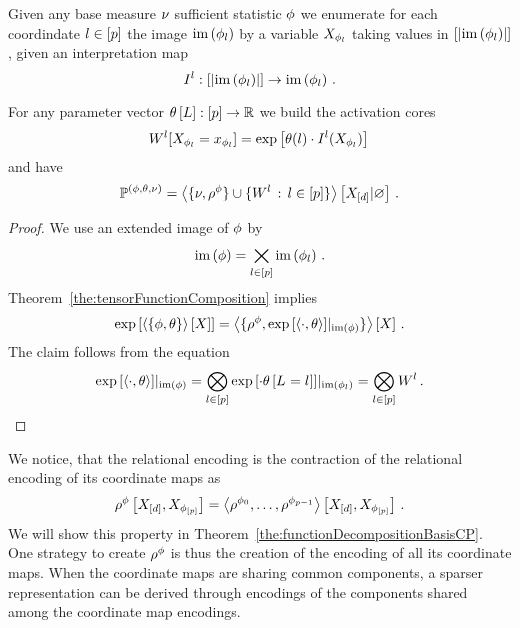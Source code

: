 \begin{theorem}\label{def:expFamilyTensorRep}
	Given any base measure $\nu$ sufficient statistic $\phi$ we enumerate for each coordindate $l\in[p]$ the image $\mathrm{im}\left(\phi_{l}\right)$ by a variable $X_{\phi_{l}}$ taking values in $[\left|\mathrm{im}\left(\phi_{l}\right)\right|]$, given an interpretation map
		\[ I^{l} : 
		[\left|\mathrm{im}\left(\phi_{l}\right)\right|] \rightarrow \mathrm{im}\left(\phi_{l}\right) \, . \]
	
	For any parameter vector $\theta\left[L\right]:[p]\rightarrow\mathbb{R}$ we build the activation cores
		\[ W^{l}[X_{\phi_{l}}=x_{\phi_{l}}] 
		= \mathrm{exp}\left[\theta(l) \cdot I^{l}(X_{\phi_{l}}) \right] \,   \]
	and have
		\[ \mathbb{P}^{(\phi,\theta,\nu)} = 
		\left\langle \{\nu,\rho^{\phi}\}\cup\{W^{l} \, : \, l\in[p]\}\right\rangle \left[ X_{[d]} | \varnothing \right] \, . 
		\]
\end{theorem}
\begin{proof}
	We use an extended image of $\phi$ by  %
		\[ \mathrm{im}\left(\phi\right) = \bigtimes_{l\in[p]} \mathrm{im}\left(\phi_{l}\right) \, . \]
	Theorem~\ref{the:tensorFunctionComposition} implies
		\[ \mathrm{exp}\left[\left\langle \{\phi, \theta\}\right\rangle \left[ X \right]\right]
		= \left\langle \{\rho^{\phi}, {\mathrm{exp}\left[\braket{\cdot, \theta}\right]}|_{\mathrm{im}\left(\phi\right)} \}\right\rangle \left[ X \right] \, . \]
	The claim follows from the equation
		\[ {\mathrm{exp}\left[\braket{\cdot, \theta}\right]}|_{\mathrm{im}\left(\phi\right)} 
		= \bigotimes_{l\in[p]} {\mathrm{exp}\left[\cdot \theta\left[L_{}=l_{}\right]\right]}|_{\mathrm{im}\left(\phi_{l}\right)}  
		= \bigotimes_{l\in[p]} W^{l} \, . \]
\end{proof}


We notice, that the relational encoding is the contraction of the relational encoding of its coordinate maps as 
	\[ \rho^{\phi}\left[X_{[d]},X_{\phi_{[p]}}\right] = \left\langle \rho^{\phi_{0}},\ldots,\rho^{\phi_{p-1}}\right\rangle \left[ X_{[d]},X_{\phi_{[p]}} \right] \, .  \]
We will show this property in Theorem~\ref{the:functionDecompositionBasisCP}.
One strategy to create $\rho^{\phi}$ is thus the creation of the encoding of all its coordinate maps.
When the coordinate maps are sharing common components, a sparser representation can be derived through encodings of the components shared among the coordinate map encodings.



